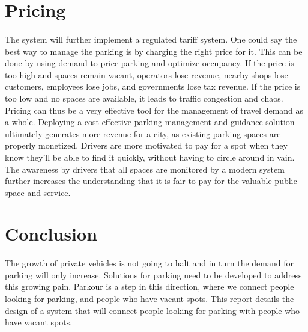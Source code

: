     \section{Pricing}
    \paragraph*{}
    The system will further implement a regulated tariff system. One could say the best way to manage the parking is by charging the right price for it. This can be done by using demand to price parking and optimize occupancy. If the price is too high and spaces remain vacant, operators lose revenue, nearby shops lose customers, employees lose jobs, and governments lose tax revenue. If the price is too low and no spaces are available, it leads to traffic congestion and chaos. Pricing can thus be a very effective tool for the management of travel demand as a whole. Deploying a cost-effective parking management and guidance solution ultimately generates more revenue for a city, as existing parking spaces are properly monetized. Drivers are more motivated to pay for a spot when they know they’ll be able to find it quickly, without having to circle around in vain. The awareness by drivers that all spaces are monitored by a modern system further increases the understanding that it is fair to pay for the valuable public space and service. 

\section{Conclusion}
\paragraph*{}

    The growth of private vehicles is not going to halt and in turn the demand for parking will only increase. Solutions for parking need to be developed to address this growing pain. Parkour is a step in this direction, where we connect people looking for parking, and people who have vacant spots. This report details the design of a system that will connect people looking for parking with people who have vacant spots. 
